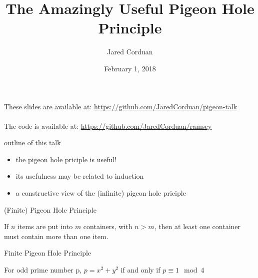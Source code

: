 \documentclass{beamer}
\title[Pigeon Hole Principle]{The Amazingly Useful Pigeon Hole Principle}
\author[]{Jared Corduan}
\date{February 1, 2018}
\newcommand{\vs}{\\~\\}
\begin{document}
\begin{frame}
  \titlepage
\end{frame}

\begin{frame}
  These slides are available at:
  \url{https://github.com/JaredCorduan/pigeon-talk}
  \vs
  The code is available at:
  \url{https://github.com/JaredCorduan/ramsey}
\end{frame}

\begin{frame}{outline of this talk}
  \begin{itemize}
    \item the pigeon hole priciple is useful!
    \item its usefulness may be related to induction
    \item a constructive view of the (infinite) pigeon hole priciple
  \end{itemize}
\end{frame}

\begin{frame}{(Finite) Pigeon Hole Principle}
  \begin{definition}
    If $n$ items are put into $m$ containers, with $n > m$,
    then at least one container must contain more than one item.
  \end{definition}
\end{frame}

\begin{frame}{Finite Pigeon Hole Principle}
  \begin{theorem}
    For odd prime number p,
    $p=x^2+y^2$ if and only if $p \equiv 1 \mod 4$
  \end{theorem}

\end{frame}
\end{document}
